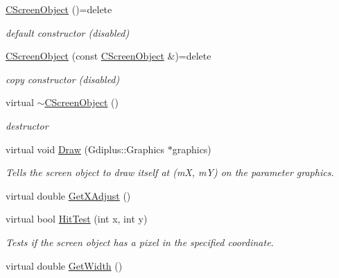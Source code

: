 \begin{DoxyCompactItemize}
\item 
\mbox{\label{class_c_screen_object_a80bd71b5ef2407d013fe81b4fd7806cb}} 
\mbox{\hyperlink{class_c_screen_object_a80bd71b5ef2407d013fe81b4fd7806cb}{C\+Screen\+Object}} ()=delete
\begin{DoxyCompactList}\small\item\em default constructor (disabled) \end{DoxyCompactList}\item 
\mbox{\label{class_c_screen_object_abbbd523822f8ea9e8d2db65efc0ccbda}} 
\mbox{\hyperlink{class_c_screen_object_abbbd523822f8ea9e8d2db65efc0ccbda}{C\+Screen\+Object}} (const \mbox{\hyperlink{class_c_screen_object}{C\+Screen\+Object}} \&)=delete
\begin{DoxyCompactList}\small\item\em copy constructor (disabled) \end{DoxyCompactList}\item 
virtual \mbox{\hyperlink{class_c_screen_object_a4d71a9079b9e3558fed4d65ccda628b4}{$\sim$\+C\+Screen\+Object}} ()
\begin{DoxyCompactList}\small\item\em destructor \end{DoxyCompactList}\item 
virtual void \mbox{\hyperlink{class_c_screen_object_ad9481ae325ca2374986c61fb6545fbe2}{Draw}} (Gdiplus\+::\+Graphics $\ast$graphics)
\begin{DoxyCompactList}\small\item\em Tells the screen object to draw itself at (mX, mY) on the parameter graphics. \end{DoxyCompactList}\item 
virtual double \mbox{\hyperlink{class_c_screen_object_abec4a44a5e437c944188081ccdf41d50}{Get\+X\+Adjust}} ()
\item 
virtual bool \mbox{\hyperlink{class_c_screen_object_a92a3f69608fa214184c0c82a33569a07}{Hit\+Test}} (int x, int y)
\begin{DoxyCompactList}\small\item\em Tests if the screen object has a pixel in the specified coordinate. \end{DoxyCompactList}\item 
virtual double \mbox{\hyperlink{class_c_screen_object_ac32f1b9ea19e703276b2a8880edd4022}{Get\+Width}} ()

\end{DoxyCompactItemize}
